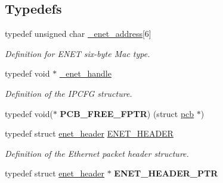 \subsection*{Typedefs}
\begin{DoxyCompactItemize}
\item 
typedef unsigned char \hyperlink{group__enet__rtcs__adaptor_ga82c41b61a1376f4a48ede6c89b9c4f2f}{\+\_\+enet\+\_\+address}\mbox{[}6\mbox{]}\hypertarget{group__enet__rtcs__adaptor_ga82c41b61a1376f4a48ede6c89b9c4f2f}{}\label{group__enet__rtcs__adaptor_ga82c41b61a1376f4a48ede6c89b9c4f2f}

\begin{DoxyCompactList}\small\item\em Definition for E\+N\+ET six-\/byte Mac type. \end{DoxyCompactList}\item 
typedef void $\ast$ \hyperlink{group__enet__rtcs__adaptor_gac8e61675abb18254042bf944bf122def}{\+\_\+enet\+\_\+handle}\hypertarget{group__enet__rtcs__adaptor_gac8e61675abb18254042bf944bf122def}{}\label{group__enet__rtcs__adaptor_gac8e61675abb18254042bf944bf122def}

\begin{DoxyCompactList}\small\item\em Definition of the I\+P\+C\+FG structure. \end{DoxyCompactList}\item 
typedef void($\ast$ {\bfseries P\+C\+B\+\_\+\+F\+R\+E\+E\+\_\+\+F\+P\+TR}) (struct \hyperlink{structpcb}{pcb} $\ast$)\hypertarget{group__enet__rtcs__adaptor_ga63ac2112a501bd4f951374ad18fefd52}{}\label{group__enet__rtcs__adaptor_ga63ac2112a501bd4f951374ad18fefd52}

\item 
typedef struct \hyperlink{structenet__header}{enet\+\_\+header} \hyperlink{group__enet__rtcs__adaptor_ga1ef6976690a57a3ac6674eea80dced70}{E\+N\+E\+T\+\_\+\+H\+E\+A\+D\+ER}\hypertarget{group__enet__rtcs__adaptor_ga1ef6976690a57a3ac6674eea80dced70}{}\label{group__enet__rtcs__adaptor_ga1ef6976690a57a3ac6674eea80dced70}

\begin{DoxyCompactList}\small\item\em Definition of the Ethernet packet header structure. \end{DoxyCompactList}\item 
typedef struct \hyperlink{structenet__header}{enet\+\_\+header} $\ast$ {\bfseries E\+N\+E\+T\+\_\+\+H\+E\+A\+D\+E\+R\+\_\+\+P\+TR}\hypertarget{group__enet__rtcs__adaptor_gad53ac4e88a10662944675ca56f0c893e}{}\label{group__enet__rtcs__adaptor_gad53ac4e88a10662944675ca56f0c893e}


\end{DoxyCompactItemize}
